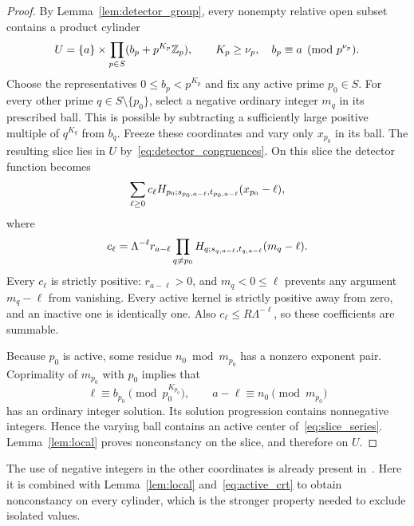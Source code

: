 \begin{proof}
By Lemma~\ref{lem:detector_group}, every nonempty relative open subset
contains a product cylinder
\begin{equation}\label{eq:cylinder}
 U=\{a\}\times\prod_{p\in S}(b_p+p^{K_p}\mathbb Z_p),
 \qquad K_p\geq\nu_p,\quad b_p\equiv a\pmod{p^{\nu_p}}.
\end{equation}
Choose the representatives $0\leq b_p<p^{K_p}$ and fix any active prime
$p_0\in S$. For every other prime $q\in S\setminus\{p_0\}$, select a
negative ordinary integer $m_q$ in its prescribed ball. This is possible
by subtracting a sufficiently large positive multiple of $q^{K_q}$ from
$b_q$. Freeze these coordinates and vary only $x_{p_0}$ in its ball.
The resulting slice lies in $U$ by~\eqref{eq:detector_congruences}.
On this slice the detector function becomes
\begin{equation}\label{eq:slice_series}
 \sum_{\ell\geq0}c_\ell
   H_{p_0;s_{p_0,a-\ell},t_{p_0,a-\ell}}(x_{p_0}-\ell),
\end{equation}
where
\[
 c_\ell=\Lambda^{-\ell}r_{a-\ell}
       \prod_{q\neq p_0}
       H_{q;s_{q,a-\ell},t_{q,a-\ell}}(m_q-\ell).
\]
Every $c_\ell$ is strictly positive: $r_{a-\ell}>0$, and
$m_q<0\leq\ell$ prevents any argument $m_q-\ell$ from vanishing.
Every active kernel is strictly positive away from zero, and an inactive
one is identically one. Also $c_\ell\leq R\Lambda^{-\ell}$, so these
coefficients are summable.

Because $p_0$ is active, some residue $n_0\bmod m_{p_0}$ has a nonzero
exponent pair. Coprimality of $m_{p_0}$ with $p_0$ implies that
\begin{equation}\label{eq:active_crt}
 \ell\equiv b_{p_0}\pmod{p_0^{K_{p_0}}},\qquad
 a-\ell\equiv n_0\pmod{m_{p_0}}
\end{equation}
has an ordinary integer solution. Its solution progression contains
nonnegative integers. Hence the varying ball contains an active center
of~\eqref{eq:slice_series}. Lemma~\ref{lem:local} proves nonconstancy
on the slice, and therefore on $U$.
\end{proof}

The use of negative integers in the other coordinates is already present
in~\cite[proof of Theorem 12.5.1, pp.~132--133]{bch2024}. Here it is
combined with Lemma~\ref{lem:local} and~\eqref{eq:active_crt} to obtain
nonconstancy on every cylinder, which is the stronger property needed
to exclude isolated values.


